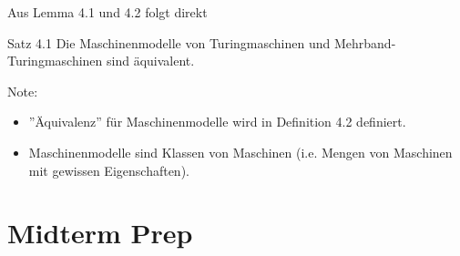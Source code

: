\documentclass[a4paper, 11pt]{article}
\def\N{\mathbb{N}}
\begin{document}
        Aus Lemma 4.1 und 4.2 folgt direkt
        \begin{mainbox}{Satz 4.1}
            Die Maschinenmodelle von Turingmaschinen und Mehrband-Turingmaschinen sind äquivalent.
        \end{mainbox}
        Note: 
        \begin{itemize}
            \item ''Äquivalenz'' für Maschinenmodelle wird in Definition 4.2 definiert.
            \item Maschinenmodelle sind Klassen von Maschinen (i.e. Mengen von Maschinen mit gewissen Eigenschaften).
        \end{itemize}
    
    
    
    
    \section{Midterm Prep}
    







    
    
    
\end{document}

